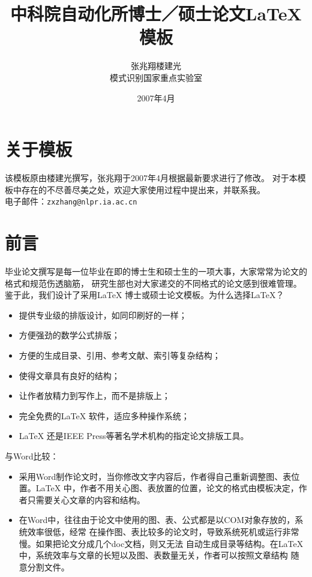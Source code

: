 \documentclass [12pt,a4paper,openany,twoside] {article}
\begin{document}
\begin{CJK*}{UTF8}{song}
\title{中科院自动化所博士／硕士论文\LaTeX 模板}
\author{张兆翔\quad \quad 楼建光\\模式识别国家重点实验室}
\date{2007年4月}
\maketitle
\section{关于模板}
该模板原由楼建光撰写，张兆翔于2007年4月根据最新要求进行了修改。
对于本模板中存在的不尽善尽美之处，欢迎大家使用过程中提出来，并联系我。\\
电子邮件：\tt{zxzhang@nlpr.ia.ac.cn}
\section{前言}
毕业论文撰写是每一位毕业在即的博士生和硕士生的一项大事，大家常常为论文的格式和规范伤透脑筋，
研究生部也对大家递交的不同格式的论文感到很难管理。鉴于此，我们设计了采用\LaTeX
博士或硕士论文模板。为什么选择\LaTeX ？
\begin{itemize}
    \item 提供专业级的排版设计，如同印刷好的一样；
    \item 方便强劲的数学公式排版；
    \item 方便的生成目录、引用、参考文献、索引等复杂结构；
    \item 使得文章具有良好的结构；
    \item 让作者放精力到写作上，而不是排版上；
    \item 完全免费的\LaTeX{} 软件，适应多种操作系统；
    \item \LaTeX{} 还是IEEE Press等著名学术机构的指定论文排版工具。
\end{itemize}
与Word比较：
\begin{itemize}
    \item 采用Word制作论文时，当你修改文字内容后，作者得自己重新调整图、表位置。\LaTeX
    中，作者不用关心图、表放置的位置，论文的格式由模板决定，作者只需要关心文章的内容和结构。
    \item 在Word中，往往由于论文中使用的图、表、公式都是以COM对象存放的，系统效率很低，经常
    在操作图、表比较多的论文时，导致系统死机或运行非常慢。如果把论文分成几个doc文档，则又无法
    自动生成目录等结构。在\LaTeX 中，系统效率与文章的长短以及图、表数量无关，作者可以按照文章结构
    随意分割文件。
\end{itemize}


\end{CJK*}
\end{document}
